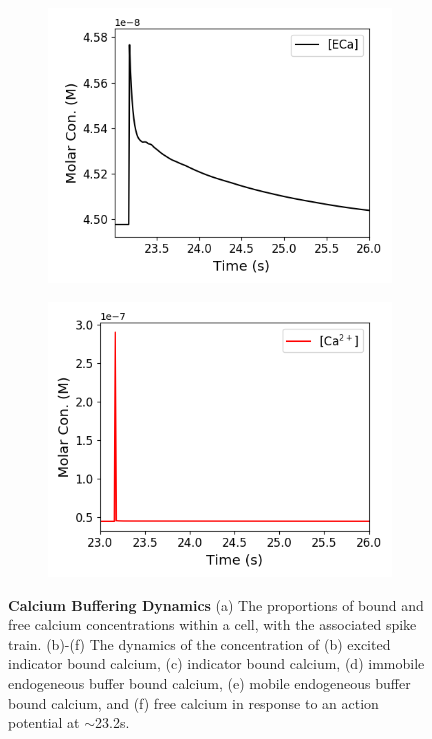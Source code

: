 \documentclass[a4paper,12pt]{article}
\theoremstyle{definition}
\begin{document}
\begin{figure}[p]
\begin{subfigure}{0.5\textwidth}
    \includegraphics[width=\textwidth]{figures/concentration_dynamics_18_zoomed_ECa.png}
    \caption{}
  \end{subfigure}
  \begin{subfigure}{0.5\textwidth}
    \includegraphics[width=\textwidth]{figures/concentration_dynamics_18_zoomed_Ca.png}
    \caption{}
  \end{subfigure}
  \caption{\textbf{Calcium Buffering Dynamics } (a) The proportions of bound and free calcium concentrations within a cell, with the associated spike train. (b)-(f) The dynamics of the concentration of (b) excited indicator bound calcium, (c) indicator bound calcium, (d) immobile endogeneous buffer bound calcium, (e) mobile endogeneous buffer bound calcium, and (f) free calcium in response to an action potential at $\sim$23.2s.}
  \label{fig:concentrations}
\end{figure}
\end{document}
